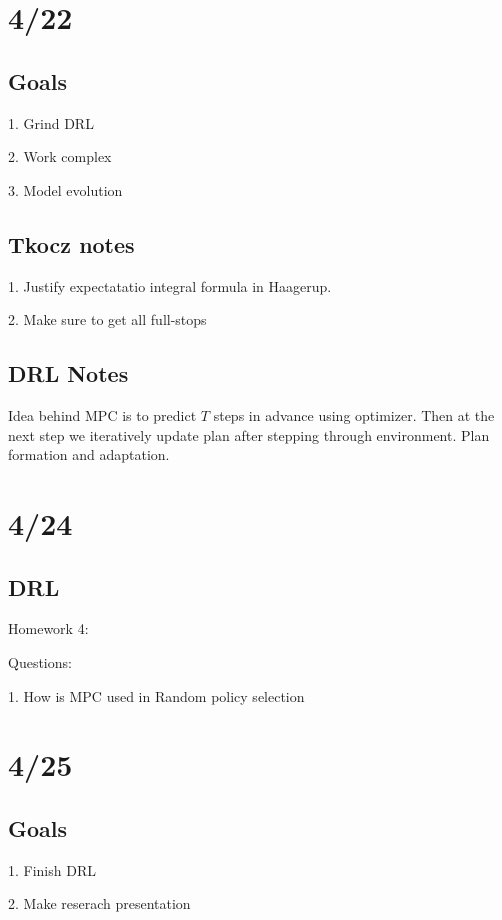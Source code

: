 \documentclass[11pt]{article}
\theoremstyle{remark}
\begin{document}
\section{4/22}

\subsection{Goals}

1. Grind DRL

2. Work complex

3. Model evolution

\subsection{Tkocz notes}

1. Justify expectatatio integral formula in Haagerup.

2. Make sure to get all full-stops

\subsection{DRL Notes}

Idea behind MPC is to predict $T$ steps in advance using optimizer. Then at the next step we iteratively update plan after stepping through environment. Plan formation and adaptation.

\section{4/24}

\subsection{DRL}

Homework 4:

	Questions:

	1. How is MPC used in Random policy selection

\section{4/25}

\subsection{Goals}

1. Finish DRL

2. Make reserach presentation
\end{document}
